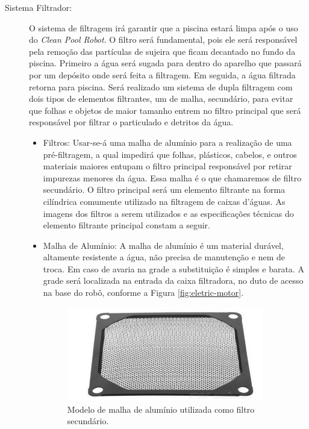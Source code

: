 \begin{description}
\item[Sistema Filtrador:] O sistema de filtragem irá garantir que a piscina
estará limpa após o uso do \textit{Clean Pool Robot}. O filtro será fundamental,
pois ele será responsável pela remoção das partículas de sujeira que ficam decantado
no fundo da piscina. Primeiro a água será sugada para dentro do aparelho que passará por
um depósito onde será feita a filtragem. Em seguida, a água filtrada retorna para
piscina. Será realizado um sistema de dupla filtragem com dois tipos de elementos
filtrantes, um de malha, secundário, para evitar que folhas e objetos de maior
tamanho entrem no filtro principal que será responsável por filtrar o particulado
e detritos da água.
\begin{itemize}
  \item Filtros: Usar-se-á uma malha de alumínio para a realização de uma
  pré-filtragem, a qual impedirá que folhas, plásticos, cabelos, e outros
  materiais maiores entupam o filtro principal responsável por retirar impurezas
  menores da água. Essa malha é o que chamaremos de filtro secundário. O filtro
  principal será um elemento filtrante na forma cilíndrica comumente utilizado
  na filtragem de caixas d’águas. As imagens dos filtros a serem utilizados e as
  especificações técnicas do elemento filtrante principal constam a seguir.
  \item Malha de Alumínio: A malha de alumínio é um material durável, altamente
  resistente a água, não precisa de manutenção e nem de troca. Em caso de avaria na
  grade a substituição é simples e barata. A grade será localizada na entrada
  da caixa filtradora, no duto de acesso na base do robô, conforme a Figura \ref{fig:eletric-motor}.
  \par
  \begin{figure}[h]
    \centering
    \includegraphics[width=0.9\textwidth]{figures/mesh-aluminium.png}
    \caption{Modelo de malha de alumínio utilizada como filtro secundário. \cite{dx2016}}
    \label{fig:mesh-aluminium}

\end{figure}
\end{itemize}
\end{description}
